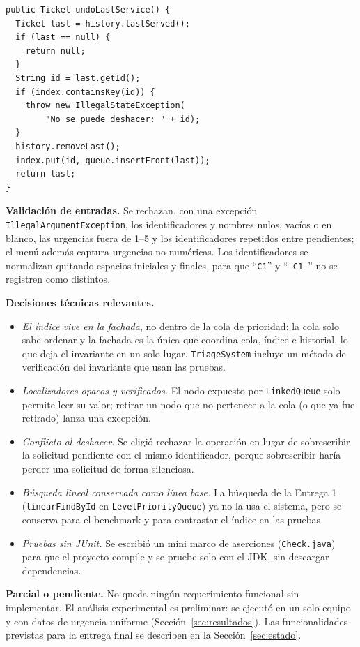 \begin{lstlisting}[caption={Deshacer en \texttt{TriageSystem} (mensaje abreviado)},label={lst:undo},float=t]
public Ticket undoLastService() {
  Ticket last = history.lastServed();
  if (last == null) {
    return null;
  }
  String id = last.getId();
  if (index.containsKey(id)) {
    throw new IllegalStateException(
        "No se puede deshacer: " + id);
  }
  history.removeLast();
  index.put(id, queue.insertFront(last));
  return last;
}
\end{lstlisting}

\textbf{Validación de entradas.} Se rechazan, con una excepción
\texttt{IllegalArgument\-Exception}, los identificadores y nombres nulos,
vacíos o en blanco, las urgencias fuera de 1--5 y los identificadores
repetidos entre pendientes; el menú además captura urgencias no numéricas.
Los identificadores se normalizan quitando espacios iniciales y finales,
para que ``\texttt{C1}'' y ``\texttt{\ C1\ }'' no se registren como distintos.

\textbf{Decisiones técnicas relevantes.}
\begin{itemize}
  \item \emph{El índice vive en la fachada}, no dentro de la cola de
    prioridad: la cola solo sabe ordenar y la fachada es la única que
    coordina cola, índice e historial, lo que deja el invariante en un solo
    lugar. \texttt{TriageSystem} incluye un método de verificación del
    invariante que usan las pruebas.
  \item \emph{Localizadores opacos y verificados.} El nodo expuesto por
    \texttt{LinkedQueue} solo permite leer su valor; retirar un nodo que no
    pertenece a la cola (o que ya fue retirado) lanza una excepción.
  \item \emph{Conflicto al deshacer.} Se eligió rechazar la operación en
    lugar de sobrescribir la solicitud pendiente con el mismo
    identificador, porque sobrescribir haría perder una solicitud de forma
    silenciosa.
  \item \emph{Búsqueda lineal conservada como línea base.} La búsqueda
    de la Entrega 1 (\texttt{linearFindById} en
    \texttt{LevelPriorityQueue}) ya no la usa el sistema, pero se conserva para el benchmark y para
    contrastar el índice en las pruebas.
  \item \emph{Pruebas sin JUnit.} Se escribió un mini marco de aserciones
    (\texttt{Check.java}) para que el proyecto compile y se pruebe solo con
    el JDK, sin descargar dependencias.
\end{itemize}

\textbf{Parcial o pendiente.} No queda ningún requerimiento funcional sin
implementar. El análisis experimental es preliminar: se ejecutó en un solo
equipo y con datos de urgencia uniforme (Sección~\ref{sec:resultados}).
Las funcionalidades previstas para la entrega final se describen en la
Sección~\ref{sec:estado}.
